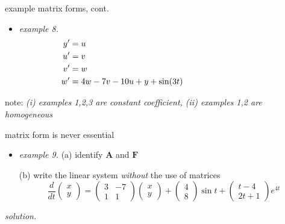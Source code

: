 \documentclass[urlcolor=blue,dvipsnames]{beamer}
\newcommand{\bA}{\mathbf{A}}
\newcommand{\bF}{\mathbf{F}}
\begin{document}
\begin{frame}{example matrix forms, cont.}

\small
\begin{itemize}
\item \emph{example 8.}
\begin{align*}
y' &= u \hspace{75mm} \\
u' &= v \\
v' &= w \\
w' &= 4w-7v-10u+y+\sin(3t)
\end{align*}
\end{itemize}

\vspace{30mm}
\scriptsize note: \emph{(i) examples 1,2,3 are constant coefficient, (ii) examples 1,2 are homogeneous}
\end{frame}


\begin{frame}{matrix form is never essential}

\begin{itemize}
\item \emph{example 9.}  (a) identify $\bA$ and $\bF$

(b) write the linear system \emph{without} the use of matrices
    $$\frac{d}{dt} \begin{pmatrix} x \\ y \end{pmatrix} =  \begin{pmatrix} 3 & -7 \\ 1 & 1 \end{pmatrix} \begin{pmatrix} x \\ y \end{pmatrix} + \begin{pmatrix} 4 \\ 8 \end{pmatrix} \sin t + \begin{pmatrix} t-4 \\ 2t+1 \end{pmatrix} e^{4t}$$
\end{itemize}

\noindent \emph{solution.}

\vspace{50mm}
\end{frame}
\end{document}
